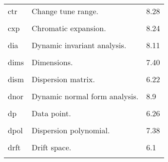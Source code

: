 \begin{center}
\begin{tabular}{lll}
\hspace{1.5em}ctr     &    Change tune range.    &   \hspace{2em}8.28\\
\vspace{-3mm}& &\\
\hspace{1.5em}cxp     &    Chromatic expansion.    &   \hspace{2em}8.24\\
\vspace{-3mm}& &\\\hspace{1.5em}dia     &     Dynamic invariant analysis.  &  \hspace{2em}8.11\\
\vspace{-3mm}& &\\
\hspace{1.5em}dims  &  Dimensions.  &   \hspace{2em}7.40\\
\vspace{-3mm}& &\\
\hspace{1.5em}dism    &    Dispersion matrix.            &  \hspace{2em}6.22\\
\vspace{-3mm}& &\\
\hspace{1.5em}dnor    &     Dynamic normal form analysis.  &  \hspace{2em}8.9\\
\vspace{-3mm}& &\\
\hspace{1.5em}dp  &         Data point.      & \hspace{2em}6.26\\
\vspace{-3mm}& &\\
\hspace{1.5em}dpol  &         Dispersion polynomial.      & \hspace{2em}7.38\\
\vspace{-3mm}& &\\
\hspace{1.5em}drft    &         Drift space.       &  \hspace{2em}6.1 \\
\vspace{-3mm}& &\\

\end{tabular}
\end{center}
